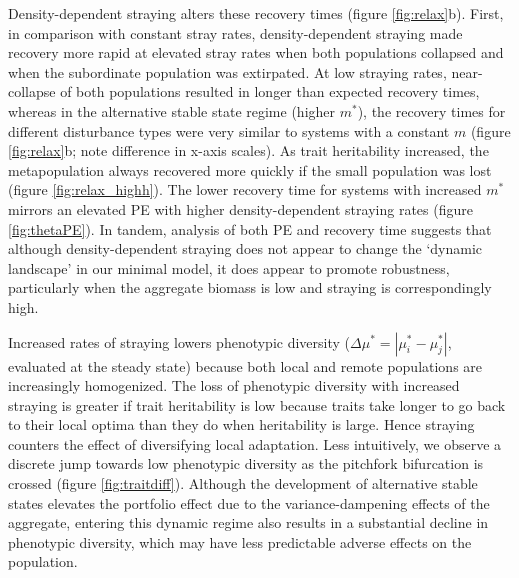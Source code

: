 \documentclass{revtex4}
\begin{document}
Density-dependent straying alters these recovery times (figure \ref{fig:relax}b). 
First, in comparison with constant stray rates, density-dependent straying made recovery more rapid at elevated stray rates when both populations collapsed and when the subordinate population was extirpated.
At low straying rates, near-collapse of both populations resulted in longer than expected recovery times, whereas in the alternative stable state regime (higher $m^*$), the recovery times for different disturbance types were very similar to systems with a constant $m$ (figure \ref{fig:relax}b; note difference in x-axis scales).
As trait heritability increased, the metapopulation always recovered more quickly if the small population was lost (figure \ref{fig:relax_highh}).
The lower recovery time for systems with increased $m^*$ mirrors an elevated PE with higher density-dependent straying rates (figure \ref{fig:thetaPE}).
In tandem, analysis of both PE and recovery time suggests that although density-dependent straying does not appear to change the `dynamic landscape' in our minimal model, it does appear to promote robustness, particularly when the aggregate biomass is low and straying is correspondingly high.





Increased rates of straying lowers phenotypic diversity ($\Delta \mu^* = |\mu_i^*-\mu_j^*|$, evaluated at the steady state) because both local and remote populations are increasingly homogenized.
The loss of phenotypic diversity with increased straying is greater if trait heritability is low because traits take longer to go back to their local optima than they do when heritability is large. 
Hence straying counters the effect of diversifying local adaptation. 
Less intuitively, we observe a discrete jump towards low phenotypic diversity as the pitchfork bifurcation is crossed (figure \ref{fig:traitdiff}).
Although the development of alternative stable states elevates the portfolio effect due to the variance-dampening effects of the aggregate, entering this dynamic regime also results in a substantial decline in phenotypic diversity, which may have less predictable adverse effects on the population. 
\\
\end{document}
